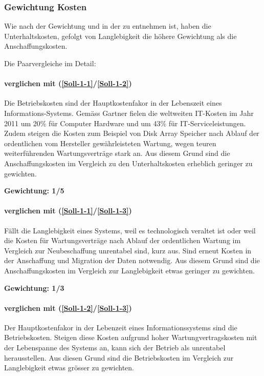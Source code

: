 \subsubsection*{Gewichtung Kosten}

Wie nach der Gewichtung und in der  zu entnehmen ist, haben die Unterhaltskosten, gefolgt von Langlebigkeit die höhere Gewichtung als die Anschaffungskosten.

Die Paarvergleiche im Detail:

\paragraph*{ verglichen mit  (\ref{Soll-1-1}/\ref{Soll-1-2})}
Die Betriebskosten sind der Hauptkostenfakor in der Lebenszeit eines Informations-Systems. Gemäss Gartner fielen die weltweiten IT-Kosten im Jahr 2011 um 20\% für Computer Hardware und um 43\% für IT-Serviceleistungen. Zudem steigen die Kosten zum Beispiel von Disk Array Speicher nach Ablauf der ordentlichen vom Hersteller gewährleisteten Wartung, wegen teuren weiterführenden Wartungsverträge stark an.
Aus diesem Grund sind die Anschaffungskosten im Vergleich zu den Unterhaltskosten erheblich geringer zu gewichten.

\textbf{Gewichtung: 1/5}

\paragraph*{ verglichen mit  (\ref{Soll-1-1}/\ref{Soll-1-3})}
Fällt die Langlebigkeit eines Systems, weil es technologisch veraltet ist oder weil die Kosten für Wartungsverträge nach Ablauf der ordentlichen Wartung im Vergleich zur Neubeschaffung unrentabel sind, kurz aus. Sind erneut Kosten in der Anschaffung und Migration der Daten notwendig. Aus diesem Grund sind die Anschaffungskosten im Vergleich zur Langlebigkeit etwas geringer zu gewichten.

\textbf{Gewichtung: 1/3}


\paragraph*{ verglichen mit  (\ref{Soll-1-2}/\ref{Soll-1-3})}
Der Hauptkostenfakor in der Lebenzeit eines Informationssystems sind die Betriebskosten. Steigen diese Kosten aufgrund hoher Wartungvertragskosten mit der Lebenspanne des Systems an, kann sich der Betrieb als unrentabel herausstellen. Aus diesen Grund sind die Betriebskosten im Vergleich zur Langlebigkeit etwas grösser zu gewichten.

